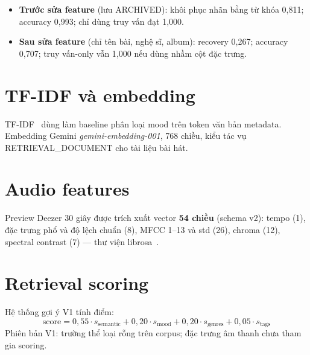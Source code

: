 \begin{itemize}
  \item \textbf{Trước sửa feature} (lưu ARCHIVED): khôi phục nhãn bằng từ khóa 0{,}811; accuracy 0{,}993; chỉ dùng truy vấn đạt 1{,}000.
  \item \textbf{Sau sửa feature} (chỉ tên bài, nghệ sĩ, album): recovery 0{,}267; accuracy 0{,}707; truy vấn-only vẫn 1{,}000 nếu dùng nhầm cột đặc trưng.
\end{itemize}

\section{TF-IDF và embedding}

TF-IDF~\cite{han2011} dùng làm baseline phân loại mood trên token văn bản metadata. Embedding Gemini \textit{gemini-embedding-001}, 768 chiều, kiểu tác vụ RETRIEVAL\_DOCUMENT cho tài liệu bài hát.

\section{Audio features}

Preview Deezer 30 giây được trích xuất vector \textbf{54 chiều} (schema v2): tempo (1), đặc trưng phổ và độ lệch chuẩn (8), MFCC 1--13 và std (26), chroma (12), spectral contrast (7) --- thư viện librosa~\cite{librosa}.

\section{Retrieval scoring}

Hệ thống gợi ý V1 tính điểm:
\begin{equation}
  \text{score} = 0{,}55 \cdot s_{\text{semantic}} + 0{,}20 \cdot s_{\text{mood}} + 0{,}20 \cdot s_{\text{genres}} + 0{,}05 \cdot s_{\text{tags}}
\end{equation}
Phiên bản V1: trường thể loại rỗng trên corpus; đặc trưng âm thanh chưa tham gia scoring.
